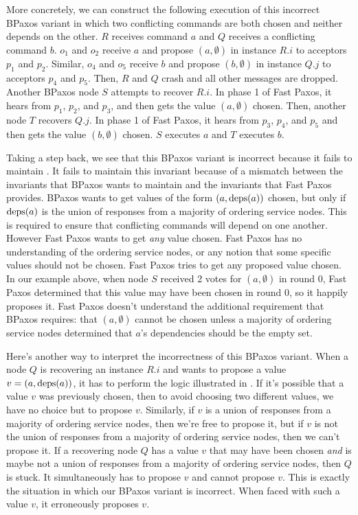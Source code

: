 More concretely, we can construct the following execution of this incorrect
BPaxos variant in which two conflicting commands are both chosen and neither
depends on the other. $R$ receives command $a$ and $Q$ receives a conflicting
command $b$.  $o_1$ and $o_2$ receive $a$ and propose $(a, \emptyset)$ in
instance $R.i$ to acceptors $p_1$ and $p_2$. Similar, $o_4$ and $o_5$ receive
$b$ and propose $(b, \emptyset)$ in instance $Q.j$ to acceptors $p_4$ and
$p_5$. Then, $R$ and $Q$ crash and all other messages are dropped. Another
BPaxos node $S$ attempts to recover $R.i$. In phase 1 of Fast Paxos, it hears
from $p_1$, $p_2$, and $p_3$, and then gets the value $(a, \emptyset)$ chosen.
Then, another node $T$ recovers $Q.j$. In phase 1 of Fast Paxos, it hears from
$p_3$, $p_4$, and $p_5$ and then gets the value $(b, \emptyset)$ chosen. $S$
executes $a$ and $T$ executes $b$.

Taking a step back, we see that this BPaxos variant is incorrect because it
fails to maintain . It fails to maintain this
invariant because of a mismatch between the invariants that BPaxos wants to
maintain and the invariants that Fast Paxos provides. BPaxos wants to get
values of the form $(a, \text{deps}(a))$ chosen, but only if $\text{deps}(a)$ is the union
of responses from a majority of ordering service nodes. This is required to
ensure that conflicting commands will depend on one another. However Fast
Paxos wants to get \emph{any} value chosen. Fast Paxos has no understanding of
the ordering service nodes, or any notion that some specific values should not
be chosen. Fast Paxos tries to get any proposed value chosen. In our example
above, when node $S$ received 2 votes for $(a, \emptyset)$ in round 0, Fast
Paxos determined that this value may have been chosen in round 0, so it happily
proposes it. Fast Paxos doesn't understand the additional requirement that
BPaxos requires: that $(a, \emptyset)$ cannot be chosen unless a majority of
ordering service nodes determined that $a$'s dependencies should be the empty
set.

Here's another way to interpret the incorrectness of this BPaxos variant. When
a node $Q$ is recovering an instance $R.i$ and wants to propose a value $v =
(a, \text{deps}(a))$, it has to perform the logic illustrated in
.
%
If it's possible that a value $v$ was previously chosen, then to avoid choosing
two different values, we have no choice but to propose $v$.
%
Similarly, if $v$ is a union of responses from a majority of ordering service
nodes, then we're free to propose it, but if $v$ is not the union of responses
from a majority of ordering service nodes, then we can't propose it.
%
If a recovering node $Q$ has a value $v$ that may have been chosen \emph{and}
is maybe not a union of responses from a majority of ordering service nodes,
then $Q$ is stuck. It simultaneously has to propose $v$ and cannot propose $v$.
This is exactly the situation in which our BPaxos variant is incorrect. When
faced with such a value $v$, it erroneously proposes $v$.

